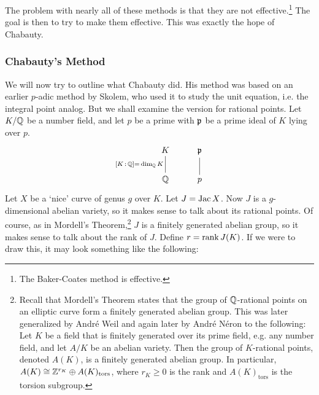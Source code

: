 The problem with nearly all of these methods is that they are not effective.\footnote{The Baker-Coates method is effective.} The goal is then to try to make them effective. This was exactly the hope of Chabauty. 



\subsubsection{Chabauty's Method}

We will now try to outline what Chabauty did. His method was based on an earlier $p$-adic method by Skolem, who used it to study the unit equation, i.e. the integral point analog. But we shall examine the version for rational points. Let $K/\mathbb{Q}$ be a number field, and let $p$ be a prime with $\mathfrak{p}$ be a prime ideal of $K$ lying over $p$.
	\[
	\begin{tikzcd}
	K \arrow[dash,swap]{d}{[K\,:\,\Q]=\,\dim_\Q K} & \p \arrow[dash]{d} \\
	\Q & p 
	\end{tikzcd}
	\]  
Let $X$ be a `nice' curve of genus $g$ over $K$. Let $J= \operatorname{Jac}  X$. Now $J$ is a $g$-dimensional abelian variety, so it makes sense to talk about its rational points. Of course, as in Mordell's Theorem,\footnote{Recall that Mordell's Theorem states that the group of $\mathbb{Q}$-rational points on an elliptic curve form a finitely generated abelian group. This was later generalized by Andr\'e Weil and again later by Andr\'e N\'eron to the following: Let $K$ be a field that is finitely generated over its prime field, e.g. any number field, and let $A/K$ be an abelian variety. Then the group of $K$-rational points, denoted $A(K)$, is a finitely generated abelian group. In particular, $A(K) \cong \mathbb{Z}^{r_K} \oplus A(K)_{\text{tors}}$, where $r_K \geq 0$ is the rank and $A(K)_{\text{tors}}$ is the torsion subgroup.} $J$ is a finitely generated abelian group, so it makes sense to talk about the rank of $J$. Define $r= \operatorname{rank} J(K)$. If we were to draw this, it may look something like the following:

